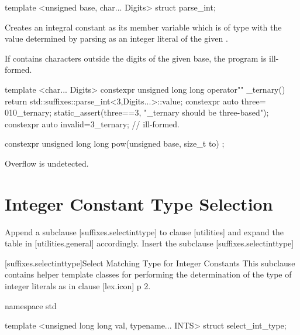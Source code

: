 \documentclass[ebook,11pt,article]{memoir}
\begin{document}
\begin{itemdecl}
template <unsigned base, char... Digits>
struct parse_int;
\end{itemdecl}

\begin{itemdescr}
\pnum
\precondition
{}
\pnum
\effects
Creates an integral constant as its  member variable  which is of type  with the value determined by parsing  as an integer literal of the given .

\pnum
If  contains characters outside the digits of the given base, the program is ill-formed.

\enterexample
\begin{codeblock}
template <char... Digits>
constexpr  unsigned long long
operator"" _ternary(){
    return std::suffixes::parse_int<3,Digits...>::value;
}
constexpr auto three= 010_ternary;
static_assert(three==3, "_ternary should be three-based");
constexpr auto invalid=3_ternary; // ill-formed.
\end{codeblock}
\exitexample
\end{itemdescr}

\begin{itemdecl}
constexpr unsigned long long
pow(unsigned base, size_t to) ;
\end{itemdecl}

\begin{itemdescr}
\pnum
\precondition
{}

\pnum
\returns {}

\pnum
Overflow is undetected.
\end{itemdescr}
\section{ Integer Constant Type Selection}
Append a subclause [suffixes.selectinttype] to clause [utilities] and expand the table in [utilities.general] accordingly.
Insert the subclause [suffixes.selectinttype]

[suffixes.selectinttype]{Select Matching Type for Integer Constants}
\pnum
This subclause contains helper template classes for performing the determination of the type of integer literals as in clause [lex.icon] p 2.

\begin{codeblock}
namespace std {

template <unsigned long long val, typename... INTS>
struct select_int_type;
}
\end{codeblock}
\end{document}
